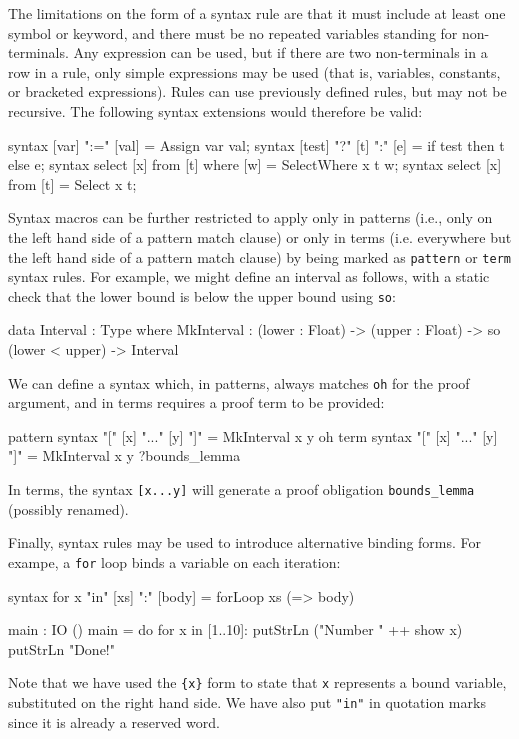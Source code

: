 \noindent
The limitations on the form of a syntax rule are that it must include at least
one symbol or keyword, and there must be no repeated variables standing for
non-terminals. Any expression can be used, but if there are two non-terminals
in a row in a rule, only simple expressions may be used (that is, variables,
constants, or bracketed expressions). Rules can use previously defined rules,
but may not be recursive.  The following syntax extensions would therefore be
valid:

\begin{code}
syntax [var] ":=" [val]              = Assign var val;
syntax [test] "?" [t] ":" [e]        = if test then t else e;
syntax select [x] from [t] where [w] = SelectWhere x t w;
syntax select [x] from [t]           = Select x t;
\end{code}

\noindent
Syntax macros can be further restricted to apply only in patterns (i.e., only on the left
hand side of a pattern match clause) or only in terms (i.e. everywhere but the left hand side
of a pattern match clause) by being marked as \texttt{pattern} or \texttt{term} syntax
rules. For example, we might define an interval as follows, with a static check
that the lower bound is below the upper bound using \texttt{so}:

\begin{code}
data Interval : Type where
   MkInterval : (lower : Float) -> (upper : Float) -> 
                so (lower < upper) -> Interval
\end{code}

\noindent
We can define a syntax which, in patterns, always matches \texttt{oh} for the proof 
argument, and in terms requires a proof term to be provided:

\begin{code}
pattern syntax "[" [x] "..." [y] "]" = MkInterval x y oh
term    syntax "[" [x] "..." [y] "]" = MkInterval x y ?bounds_lemma
\end{code} 

\noindent
In terms, the syntax \texttt{[x...y]} will generate a proof obligation
\texttt{bounds\_lemma} (possibly renamed).

Finally, syntax rules may be used to introduce alternative binding forms. For
exampe, a \texttt{for} loop binds a variable on each iteration:

\begin{code}
syntax for {x} "in" [xs] ":" [body] = forLoop xs (\x => body)
  
main : IO ()
main = do for x in [1..10]:
              putStrLn ("Number " ++ show x)
          putStrLn "Done!"
\end{code} 

\noindent
Note that we have used the \texttt{\{x\}} form to state that \texttt{x} represents
a bound variable, substituted on the right hand side. We have also put \texttt{"in"} in
quotation marks since it is already a reserved word.



